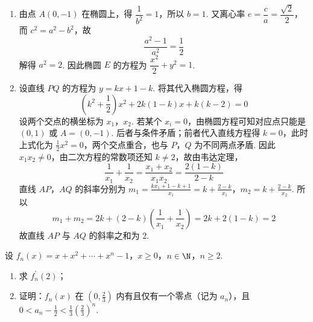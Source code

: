 \begin{solution}
\begin{enumerate}
\item
由点 \(A(0,-1)\) 在椭圆上，得 \(\dfrac{1}{b^2}=1\)，所以 \(b=1\). 又离心率 \(e=\dfrac{c}{a}=\dfrac{\sqrt{2}}{2}\)，而 \(c^2=a^2-b^2\)，故
\[
\frac{a^2-1}{a^2}=\frac{1}{2}
\]
解得 \(a^2=2\). 因此椭圆 \(E\) 的方程为 \(\dfrac{x^2}{2}+y^2=1\).

\item
设直线 \(PQ\) 的方程为 \(y=kx+1-k\). 将其代入椭圆方程，得
\[
\left(k^2+\frac{1}{2}\right)x^2+2k(1-k)x+k(k-2)=0
\]
设两个交点的横坐标为 \(x_1\)，\(x_2\). 若某个 \(x_i=0\)，由椭圆方程可知对应点只能是 \((0,1)\) 或 \(A=(0,-1)\). 后者与条件矛盾；前者代入直线方程得 \(k=0\)，此时上式化为 \(\frac{1}{2}x^2=0\)，两个交点重合，也与 \(P\)，\(Q\) 为不同两点矛盾. 因此 \(x_1x_2\ne0\)，由二次方程的常数项还知 \(k\ne2\)，故由韦达定理，
\[
\frac{1}{x_1}+\frac{1}{x_2}=\frac{x_1+x_2}{x_1x_2}=\frac{2(1-k)}{2-k}
\]
直线 \(AP\)，\(AQ\) 的斜率分别为
\(m_1=\frac{kx_1+1-k+1}{x_1}=k+\frac{2-k}{x_1}\)，\(m_2=k+\frac{2-k}{x_2}\).
所以
\[
m_1+m_2=2k+(2-k)\left(\frac{1}{x_1}+\frac{1}{x_2}\right)=2k+2(1-k)=2
\]
故直线 \(AP\) 与 \(AQ\) 的斜率之和为 \(2\).
\end{enumerate}
\end{solution}

 \begin{problem}
 设 \(f_{n}(x)=x+x^{2}+\cdots+x^{n}-1\)，\(x \geqslant 0\)，\(n \in \N\)，\(n \geqslant 2\).

\begin{enumerate}
\item 求 \(f_{n}^{\prime}(2)\)；
\item 证明：\(f_{n}(x)\) 在 \(\left(0, \frac{2}{3}\right)\) 内有且仅有一个零点（记为 \(a_{n}\)），且 \(0 < a_{n} - \frac{1}{2} < \frac{1}{3}\left(\frac{2}{3}\right)^{n}\).
 \end{enumerate}
 \end{problem}

